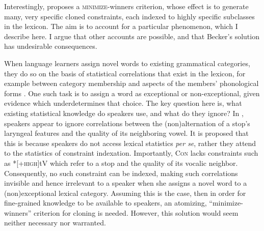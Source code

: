 \documentclass[output=paper,
modfonts
]{LSP/langsci}
\begin{document}
Interestingly, \citet{becker2009} proposes a \textsc{minimize}-winners criterion, whose effect is to generate many, very specific cloned constraints, each indexed to highly specific subclasses in the lexicon. The aim is to account for a particular phenomenon, which I describe here. I argue that other accounts are possible, and that Becker's solution has undesirable consequences.

When language learners assign novel words to existing grammatical categories, they do so on the basis of statistical correlations that exist in the lexicon, for example between category membership and aspects of the members' phonological forms \citep{poplack1982,albright2002b}. One such task is to assign a word as exceptional or non-exceptional, given evidence which underdetermines that choice. The key question here is, what existing statistical knowledge do speakers use, and what do they ignore? In , speakers appear to ignore correlations between the (non)alternation of a stop's laryngeal features and the quality of its neighboring vowel. It is proposed \citep{becker2009,becker2011r} that this is because speakers do not access lexical statistics \textit{per se}, rather they attend to the statistics of constraint indexation. Importantly, \textsc{Con} lacks constraints such as *[+\textsc{high}]tV which refer to a stop and the quality of its vocalic neighbor. Consequently, no such constraint can be indexed, making such correlations invisible and hence irrelevant to a speaker when she assigns a novel word to a (non)exceptional lexical category. Assuming this is the case, then in order for fine-grained knowledge to be available to speakers, an atomizing, ``minimize-winners'' criterion for cloning is needed. However, this solution would seem neither necessary nor warranted.
\end{document}
